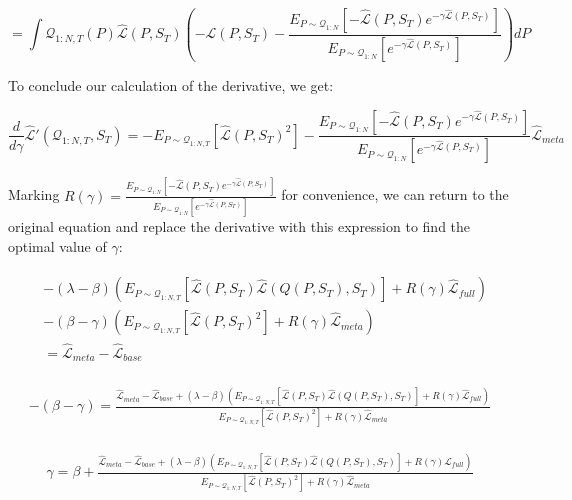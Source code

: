 \documentclass[letterpaper]{article}
\theoremstyle{definition}
\begin{document}
$$=\int \mathcal{Q}_{1:N,T}(P)\hat{\mathcal{L}}(P, S_T)\left (-\hat{\mathcal{L}}(P,S_T)-\frac{E_{P\sim \mathcal{Q}_{1:N}}\left[-\hat{\mathcal{L}}(P,S_T)e^{-\gamma\hat{\mathcal{L}}(P,S_T)} \right]}{E_{P\sim \mathcal{Q}_{1:N}}\left[e^{-\gamma\hat{\mathcal{L}}(P,S_T)} \right]}\right)dP$$

To conclude our calculation of the derivative, we get:

$$\frac{d}{d\gamma}\hat{\mathcal{L}}'(\mathcal{Q}_{1:N,T}, S_T)=-E_{P\sim \mathcal{Q}_{1:N,T}}\left [\hat{\mathcal{L}}(P,S_T)^2\right]-\frac{E_{P\sim \mathcal{Q}_{1:N}}\left[-\hat{\mathcal{L}}(P,S_T)e^{-\gamma\hat{\mathcal{L}}(P,S_T)} \right]}{E_{P\sim \mathcal{Q}_{1:N}}\left[e^{-\gamma\hat{\mathcal{L}}(P,S_T)} \right]}\hat{\mathcal{L}}_{meta} $$

Marking $R(\gamma)=\frac{E_{P\sim \mathcal{Q}_{1:N}}\left[-\hat{\mathcal{L}}(P,S_T)e^{-\gamma\hat{\mathcal{L}}(P,S_T)} \right]}{E_{P\sim \mathcal{Q}_{1:N}}\left[e^{-\gamma\hat{\mathcal{L}}(P,S_T)} \right]}$ for convenience, we can return to the original equation and replace the derivative with this expression to find the optimal value of $\gamma$:

\begin{align*} 
\begin{split}
&-(\lambda-\beta)\left (E_{P\sim \mathcal{Q}_{1:N,T}}\left [\hat{\mathcal{L}}(P,S_T)\hat{\mathcal{L}}(Q(P,S_T),S_T)\right]+R(\gamma)\hat{\mathcal{L}}_{full}\right )\\& - (\beta-\gamma)\left (E_{P\sim \mathcal{Q}_{1:N,T}}\left [\hat{\mathcal{L}}(P,S_T)^2\right]+R(\gamma)\hat{\mathcal{L}}_{meta}\right )\\& =\hat{\mathcal{L}}_{meta}-\hat{\mathcal{L}}_{base}
\end{split}
\end{align*}

\begin{align*} 
\begin{split}
 -(\beta-\gamma) = \frac{\hat{\mathcal{L}}_{meta}-\hat{\mathcal{L}}_{base}+(\lambda-\beta)\left (E_{P\sim \mathcal{Q}_{1:N,T}}\left [\hat{\mathcal{L}}(P,S_T)\hat{\mathcal{L}}(Q(P,S_T),S_T)\right]+R(\gamma)\hat{\mathcal{L}}_{full}\right )}{E_{P\sim \mathcal{Q}_{1:N,T}}\left [\hat{\mathcal{L}}(P,S_T)^2\right]+R(\gamma)\hat{\mathcal{L}}_{meta}}
\end{split}
\end{align*}

\begin{align} 
\begin{split}
\gamma = \beta+\frac{\hat{\mathcal{L}}_{meta}-\hat{\mathcal{L}}_{base}+(\lambda-\beta)\left (E_{P\sim \mathcal{Q}_{1:N,T}}\left [\hat{\mathcal{L}}(P,S_T)\hat{\mathcal{L}}(Q(P,S_T),S_T)\right]+R(\gamma)\hat{\mathcal{L}}_{full}\right )}{E_{P\sim \mathcal{Q}_{1:N,T}}\left [\hat{\mathcal{L}}(P,S_T)^2\right]+R(\gamma)\hat{\mathcal{L}}_{meta}}
\end{split}
\end{align}
\end{document}

